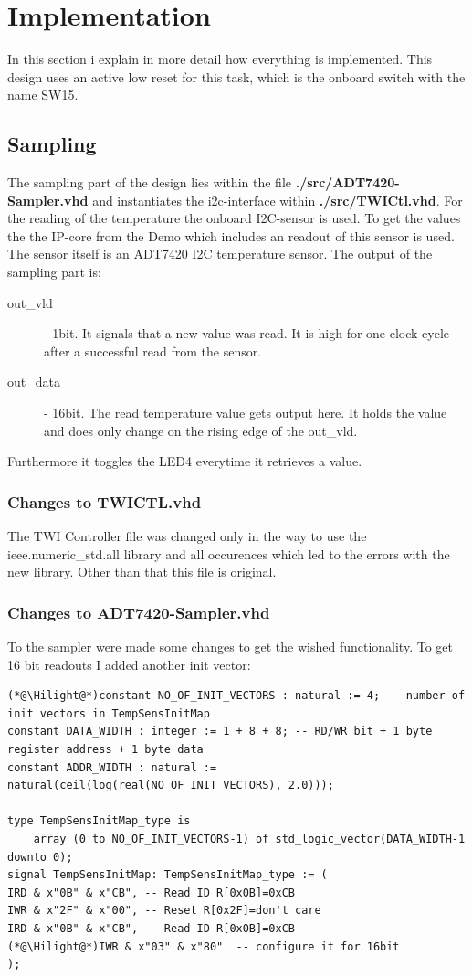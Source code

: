 \documentclass[%
	a4paper,
]
{article}
\begin{document}
\section {Implementation}
In this section i explain in more detail how everything is implemented. This design uses
 an active low reset for this task, which is the onboard switch with the name SW15.

\subsection{Sampling}
The sampling part of the design lies within the file \textbf{./src/ADT7420-Sampler.vhd} 
and instantiates the i2c-interface within \textbf{./src/TWICtl.vhd}.
For the reading of the temperature the onboard I2C-sensor is used. To get the values the
 the IP-core from the \autocite{Nexys-4-OOB} Demo which includes an readout of this sensor
 is used.
The sensor itself is an ADT7420 I2C temperature sensor. 
The output of the sampling part is:
\begin{description}
\item[out\_vld] - 1bit. It signals that a new value was read. It is high for one clock cycle after a 
successful read from the sensor.
\item[out\_data] - 16bit. The read temperature value gets output here. It holds the value and does
only change on the rising edge of the out\_vld.
\end{description}
Furthermore it toggles the LED4 everytime it retrieves a value.

\subsubsection{Changes to TWICTL.vhd}
The TWI Controller file was changed only in the way to use the ieee.numeric\_std.all library and 
all occurences which led to the errors with the new library.
Other than that this file is original.

\subsubsection{Changes to ADT7420-Sampler.vhd}
To the sampler were made some changes to get the wished functionality.
To get 16 bit readouts I added another init vector:

\lstset{style=vhdl, firstnumber=118}
\begin{lstlisting}
(*@\Hilight@*)constant NO_OF_INIT_VECTORS : natural := 4; -- number of init vectors in TempSensInitMap
constant DATA_WIDTH : integer := 1 + 8 + 8; -- RD/WR bit + 1 byte register address + 1 byte data
constant ADDR_WIDTH : natural := natural(ceil(log(real(NO_OF_INIT_VECTORS), 2.0)));

type TempSensInitMap_type is 
	array (0 to NO_OF_INIT_VECTORS-1) of std_logic_vector(DATA_WIDTH-1 downto 0);
signal TempSensInitMap: TempSensInitMap_type := (
IRD & x"0B" & x"CB", -- Read ID R[0x0B]=0xCB
IWR & x"2F" & x"00", -- Reset R[0x2F]=don't care
IRD & x"0B" & x"CB", -- Read ID R[0x0B]=0xCB
(*@\Hilight@*)IWR & x"03" & x"80"  -- configure it for 16bit
);
\end{lstlisting}
\end{document}
